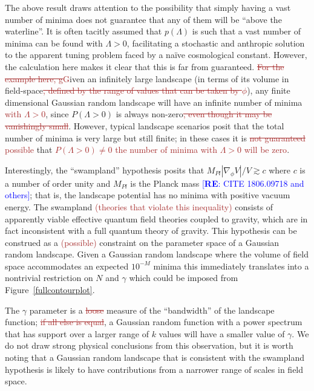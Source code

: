 \documentclass[12pt]{article}
\newcommand{\re}[1]{\textcolor{blue}{[{\bf RE}: #1]}}
\newcommand{\sh}[1]{\textcolor{brown}{#1}}
\begin{document}
The above result draws attention to the possibility that simply having a vast number of minima does not guarantee that any of them will be ``above the waterline''.  It is often tacitly assumed that $p(\Lambda)$ is such that a vast number of minima can be found with $\Lambda>0$, facilitating a stochastic and anthropic solution to the apparent tuning problem faced by a na\"ive cosmological constant. However, the calculation here makes it clear that this is far from guaranteed. \sh{\sout{For the example here, g}G}iven an infinitely large landscape (in terms of its volume in field-space\sh{\sout{, defined by the range of values that can be taken by $\phi$}}), any finite dimensional Gaussian random landscape will have an infinite number of minima \sh{with $\Lambda>0$}, since $P(\Lambda >0)$ is always non-zero\sh{\sout{, even though it may be vanishingly small}}. However, typical landscape scenarios posit that the total number of minima is very large but still finite; in these cases it is \sh{\sout{not guaranteed} possible} that \sh{\sout{$P(\Lambda >0) \ne 0$} the number of minima with $\Lambda >0$ will be zero}.  

Interestingly, the ``swampland'' hypothesis posits that $M_{Pl} |\nabla_\phi V|/ V \gtrsim c$ where $c$ is a number of order unity and $M_{Pl}$ is the Planck mass \re{CITE  1806.09718 and others}; that is, the landscape potential has no minima with  positive vacuum energy. The swampland \sh{(theories that violate this inequality)} consists of apparently viable effective quantum field theories coupled to gravity, which are in fact inconsistent with a full quantum theory of gravity. This hypothesis can be construed as a \sh{(possible)} constraint on the parameter space of a Gaussian random landscape. Given a Gaussian random landscape where the volume of field space accommodates an expected $10^{-M}$ minima this immediately translates into a nontrivial restriction on $N$ and $\gamma$ which could be imposed from  Figure~\ref{fullcontourplot}. 

The $\gamma$  parameter is a \sh{\sout{loose}} measure of the ``bandwidth'' of the landscape function; \sh{\sout{if all else is equal}}, a Gaussian random function with a power spectrum that has support over a larger range of $k$ values will have a smaller value of $\gamma$. We do not draw strong physical conclusions from this observation, but it is worth noting that a Gaussian random landscape that is consistent with the swampland hypothesis is likely to have contributions from a narrower range of scales in field space. 
\end{document}
